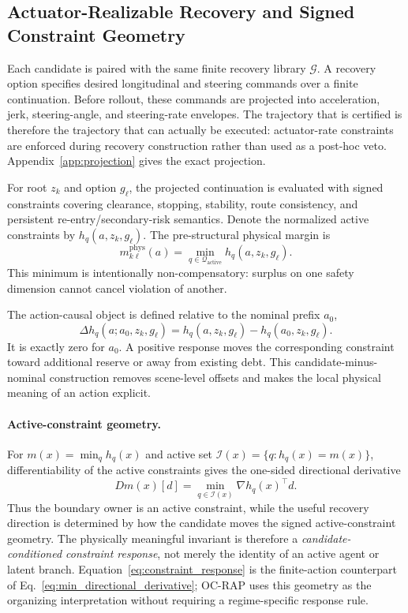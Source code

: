\documentclass{article} %
\newcommand{\cG}{\mathcal{G}}
\newcommand{\cI}{\mathcal{I}}
\newcommand{\cQ}{\mathcal{Q}}
\begin{document}
\subsection{Actuator-Realizable Recovery and Signed Constraint Geometry}
\label{subsec:executable}

Each candidate is paired with the same finite recovery library $\cG$. A recovery option specifies desired longitudinal and steering commands over a finite continuation. Before rollout, these commands are projected into acceleration, jerk, steering-angle, and steering-rate envelopes. The trajectory that is certified is therefore the trajectory that can actually be executed: actuator-rate constraints are enforced during recovery construction rather than used as a post-hoc veto. Appendix~\ref{app:projection} gives the exact projection.

For root $z_k$ and option $g_\ell$, the projected continuation is evaluated with signed constraints covering clearance, stopping, stability, route consistency, and persistent re-entry/secondary-risk semantics. Denote the normalized active constraints by $h_q(a,z_k,g_\ell)$. The pre-structural physical margin is
\begin{equation}
 m^{\mathrm{phys}}_{k\ell}(a)
 =\min_{q\in\cQ_{\mathrm{active}}} h_q(a,z_k,g_\ell).
 \label{eq:physical_margin}
\end{equation}
This minimum is intentionally non-compensatory: surplus on one safety dimension cannot cancel violation of another.

The action-causal object is defined relative to the nominal prefix $a_0$,
\begin{equation}
 \Delta h_q(a;a_0,z_k,g_\ell)
 =h_q(a,z_k,g_\ell)-h_q(a_0,z_k,g_\ell).
 \label{eq:constraint_response}
\end{equation}
It is exactly zero for $a_0$. A positive response moves the corresponding constraint toward additional reserve or away from existing debt. This candidate-minus-nominal construction removes scene-level offsets and makes the local physical meaning of an action explicit.

\paragraph{Active-constraint geometry.}
For $m(x)=\min_q h_q(x)$ and active set $\cI(x)=\{q:h_q(x)=m(x)\}$, differentiability of the active constraints gives the one-sided directional derivative
\begin{equation}
 Dm(x)[d]=\min_{q\in\cI(x)} \nabla h_q(x)^\top d.
 \label{eq:min_directional_derivative}
\end{equation}
Thus the boundary owner is an active constraint, while the useful recovery direction is determined by how the candidate moves the signed active-constraint geometry. The physically meaningful invariant is therefore a \emph{candidate-conditioned constraint response}, not merely the identity of an active agent or latent branch. Equation~\eqref{eq:constraint_response} is the finite-action counterpart of Eq.~\eqref{eq:min_directional_derivative}; OC-RAP uses this geometry as the organizing interpretation without requiring a regime-specific response rule.
\end{document}
